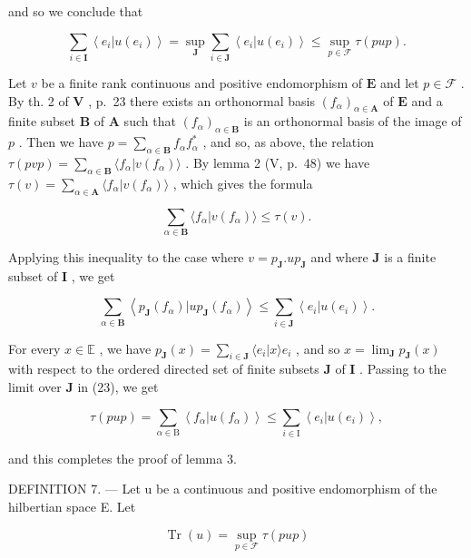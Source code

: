 and so we conclude that

\[
\sum_ {i \in \mathbf {I}} \left\langle e _ {i} | u (e _ {i}) \right\rangle = \sup _ {\mathbf {J}} \sum_ {i \in \mathbf {J}} \left\langle e _ {i} | u (e _ {i}) \right\rangle \leqslant \sup _ {p \in \mathcal {F}} \tau (p u p).
\]

Let \(v\) be a finite rank continuous and positive endomorphism of \(\mathbf{E}\) and let \(p \in \mathcal{F}\) . By th. 2 of \(\mathbf{V}\) , p.~23 there exists an orthonormal basis \((f_{\alpha})_{\alpha \in \mathbf{A}}\) of \(\mathbf{E}\) and a finite subset \(\mathbf{B}\) of \(\mathbf{A}\) such that \((f_{\alpha})_{\alpha \in \mathbf{B}}\) is an orthonormal basis of the image of \(p\) . Then we have \(p = \sum_{\alpha \in \mathbf{B}} f_{\alpha} f_{\alpha}^{*}\) , and so, as above, the relation \(\tau(pvp) = \sum_{\alpha \in \mathbf{B}} \langle f_{\alpha}|v(f_{\alpha}) \rangle\) . By lemma 2 (V, p.~48) we have \(\tau(v) = \sum_{\alpha \in \mathbf{A}} \langle f_{\alpha}|v(f_{\alpha}) \rangle\) , which gives the formula

\[
\sum_ {\alpha \in \mathbf {B}} \langle f _ {\alpha} | v (f _ {\alpha}) \rangle \leqslant \tau (v).
\]

Applying this inequality to the case where \(v = p_{\mathbf{J}}.up_{\mathbf{J}}\) and where \(\mathbf{J}\) is a finite subset of \(\mathbf{I}\) , we get

\[
\sum_ {\alpha \in \mathbf {B}} \left\langle p _ {\mathbf {J}} (f _ {\alpha}) | u p _ {\mathbf {J}} (f _ {\alpha}) \right\rangle \leqslant \sum_ {i \in \mathbf {J}} \left\langle e _ {i} | u (e _ {i}) \right\rangle .\tag{23}
\]

For every \(x \in \mathbb{E}\) , we have \(p_{\mathbf{J}}(x) = \sum_{i \in \mathbf{J}} \langle e_i | x \rangle e_i\) , and so \(x = \lim_{\mathbf{J}} p_{\mathbf{J}}(x)\) with respect to the ordered directed set of finite subsets \(\mathbf{J}\) of \(\mathbf{I}\) . Passing to the limit over \(\mathbf{J}\) in (23), we get

\[
\tau (p u p) = \sum_ {\alpha \in \mathrm{B}} \left\langle f _ {\alpha} | u (f _ {\alpha}) \right\rangle \leqslant \sum_ {i \in \mathrm{I}} \left\langle e _ {i} | u (e _ {i}) \right\rangle ,
\]

and this completes the proof of lemma 3.

DEFINITION 7. --- Let u be a continuous and positive endomorphism of the hilbertian space E. Let

\[
\operatorname{Tr} (u) = \sup _ {p \in \mathcal {F}} \tau (p u p)\tag{24}
\]

